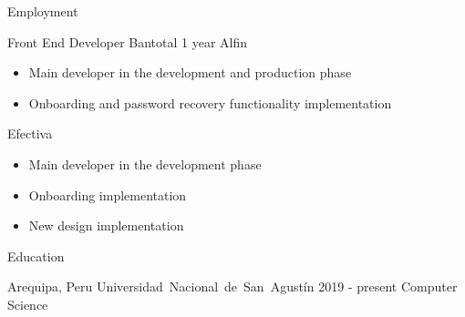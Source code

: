 \documentclass[]{mcdowell-cv/mcdowellcv}
\newcommand\en[1]{#1}
\newcommand\es[1]{}
\begin{document}
    \makeheader

    \begin{cvsection}{\en{Employment}\es{Carrera}}
        \begin{cvsubsection}
        {\en{Front End Developer}\es{Desarrollador Front End}}
        {Bantotal}
        {1 \en{year}\es{año}}
            Alfin
            \begin{itemize}
                \item
                \en{Main developer in the development and production phase}
                \es{Desarrollador principal en la fase de desarrollo y producción}

                \item
                \en{Onboarding and password recovery functionality implementation}
                \es{Implementación de las funcionalidades de onboarding y recuperación de contraseña}
            \end{itemize}

            Efectiva
            \begin{itemize}
                \item
                \en{Main developer in the development phase}
                \es{Desarrollador principal en la fase de desarrollo}

                \item
                \en{Onboarding implementation}
                \es{Implementación de la funcionalidad de onboarding}

                \item
                \en{New design implementation}
                \es{Implementación del nuevo diseño}
            \end{itemize}

        \end{cvsubsection}
    \end{cvsection}

    \begin{cvsection}{\en{Education}\es{Educación}}
        \begin{cvsubsection}
        {Arequipa, \es{Perú}\en{Peru}}
        {\mbox{Universidad Nacional de San Agustín}}
        {2019 - \en{present}\es{presente}}
            \en{Computer Science}
            \es{Ciencia de la Computación}
        \end{cvsubsection}
    \end{cvsection}
\end{document}
